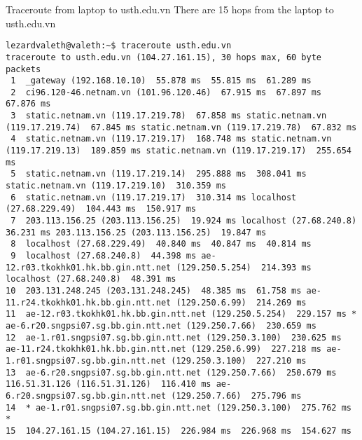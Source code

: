 \documentclass{report}
\begin{document}
\begin{section}{Traceroute from laptop to usth.edu.vn}
There are 15 hops from the laptop to usth.edu.vn
\begin{verbatim}
lezardvaleth@valeth:~$ traceroute usth.edu.vn
traceroute to usth.edu.vn (104.27.161.15), 30 hops max, 60 byte packets
 1  _gateway (192.168.10.10)  55.878 ms  55.815 ms  61.289 ms
 2  ci96.120-46.netnam.vn (101.96.120.46)  67.915 ms  67.897 ms  67.876 ms
 3  static.netnam.vn (119.17.219.78)  67.858 ms static.netnam.vn (119.17.219.74)  67.845 ms static.netnam.vn (119.17.219.78)  67.832 ms
 4  static.netnam.vn (119.17.219.17)  168.748 ms static.netnam.vn (119.17.219.13)  189.859 ms static.netnam.vn (119.17.219.17)  255.654 ms
 5  static.netnam.vn (119.17.219.14)  295.888 ms  308.041 ms static.netnam.vn (119.17.219.10)  310.359 ms
 6  static.netnam.vn (119.17.219.17)  310.314 ms localhost (27.68.229.49)  104.443 ms  150.917 ms
 7  203.113.156.25 (203.113.156.25)  19.924 ms localhost (27.68.240.8)  36.231 ms 203.113.156.25 (203.113.156.25)  19.847 ms
 8  localhost (27.68.229.49)  40.840 ms  40.847 ms  40.814 ms
 9  localhost (27.68.240.8)  44.398 ms ae-12.r03.tkokhk01.hk.bb.gin.ntt.net (129.250.5.254)  214.393 ms localhost (27.68.240.8)  48.391 ms
10  203.131.248.245 (203.131.248.245)  48.385 ms  61.758 ms ae-11.r24.tkokhk01.hk.bb.gin.ntt.net (129.250.6.99)  214.269 ms
11  ae-12.r03.tkokhk01.hk.bb.gin.ntt.net (129.250.5.254)  229.157 ms * ae-6.r20.sngpsi07.sg.bb.gin.ntt.net (129.250.7.66)  230.659 ms
12  ae-1.r01.sngpsi07.sg.bb.gin.ntt.net (129.250.3.100)  230.625 ms ae-11.r24.tkokhk01.hk.bb.gin.ntt.net (129.250.6.99)  227.218 ms ae-1.r01.sngpsi07.sg.bb.gin.ntt.net (129.250.3.100)  227.210 ms
13  ae-6.r20.sngpsi07.sg.bb.gin.ntt.net (129.250.7.66)  250.679 ms 116.51.31.126 (116.51.31.126)  116.410 ms ae-6.r20.sngpsi07.sg.bb.gin.ntt.net (129.250.7.66)  275.796 ms
14  * ae-1.r01.sngpsi07.sg.bb.gin.ntt.net (129.250.3.100)  275.762 ms *
15  104.27.161.15 (104.27.161.15)  226.984 ms  226.968 ms  154.627 ms

\end{verbatim}
\end{section}
\end{document}
